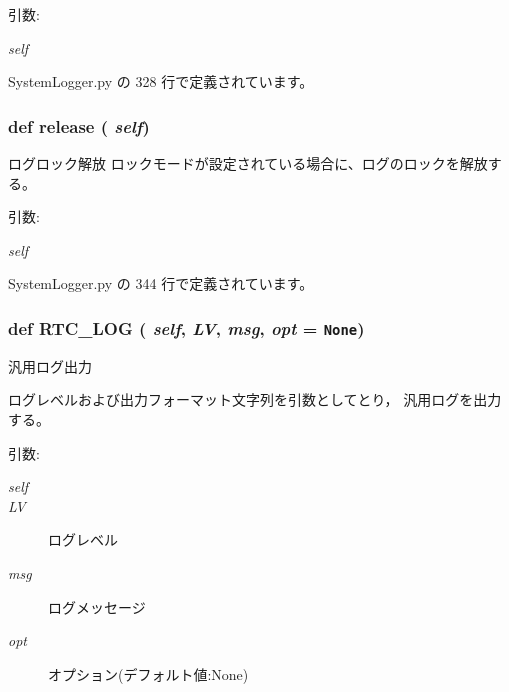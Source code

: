 \begin{Desc}
\item[引数:]
\begin{description}
\item[{\em self}]\end{description}
\end{Desc}


 SystemLogger.py の 328 行で定義されています。
\subsubsection{\setlength{\rightskip}{0pt plus 5cm}def release ( {\em self})}\label{classsource__py_1_1_system_logger_1_1_log_stream_8cac5263cadffde59ee3fa4fcb8d1f91}


ログロック解放 ロックモードが設定されている場合に、ログのロックを解放する。 

\begin{Desc}
\item[引数:]
\begin{description}
\item[{\em self}]\end{description}
\end{Desc}


 SystemLogger.py の 344 行で定義されています。
\subsubsection{\setlength{\rightskip}{0pt plus 5cm}def RTC\_\-LOG ( {\em self},  {\em LV},  {\em msg},  {\em opt} = {\tt None})}\label{classsource__py_1_1_system_logger_1_1_log_stream_f7cf11e5d7b92239f6a5aa9c01bc990a}


汎用ログ出力 

ログレベルおよび出力フォーマット文字列を引数としてとり， 汎用ログを出力する。

\begin{Desc}
\item[引数:]
\begin{description}
\item[{\em self}]\item[{\em LV}]ログレベル \item[{\em msg}]ログメッセージ \item[{\em opt}]オプション(デフォルト値:None) \end{description}
\end{Desc}


